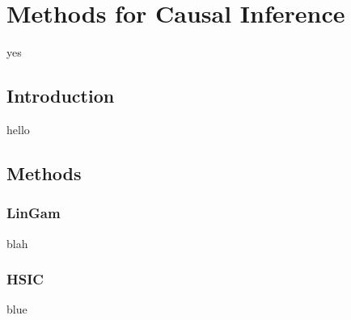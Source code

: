\chapter{Methods for Causal Inference}

yes

\section{Introduction}

hello

\section{Methods}

\subsection{LinGam}

blah

\subsection{HSIC}

blue
